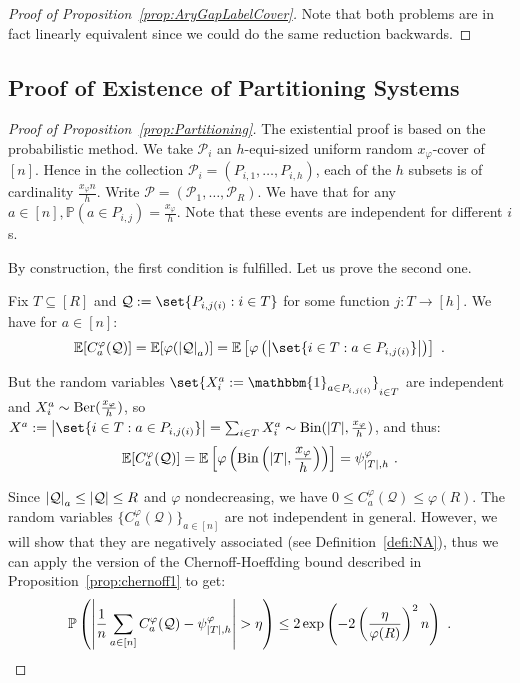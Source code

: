 \begin{proof}[Proof of Proposition~\ref{prop:AryGapLabelCover}]
 Note that both problems are in fact linearly equivalent since we could do the same reduction backwards.
 
\end{proof}

\subsection{Proof of Existence of Partitioning Systems}
\label{app:Partitioning}

\begin{proof}[Proof of Proposition~\ref{prop:Partitioning}]
    The existential proof is based on the probabilistic method. We take $\mathcal{P}_i$ an $h$-equi-sized uniform random $x_{\varphi}$-cover of $[n]$. Hence in the collection $\mathcal{P}_i=(P_{i,1},\ldots,P_{i,h})$, each of the $h$ subsets is of cardinality $\frac{x_{\varphi}n}{h}$. Write $\mathcal{P} = (\mathcal{P}_1,\ldots,\mathcal{P}_R)$. We have that for any $a \in [n], \mathbb{P}(a \in P_{i,j}) = \frac{x_{\varphi}}{h}$. Note that these events are independent for different $i$s.

    By construction, the first condition is fulfilled. Let us prove the second one.

    Fix $T \subseteq [R]$ and $\mathcal{Q} := \set{P_{i,j(i)} : i \in T}$ for some function $j : T \rightarrow [h]$. We have for $a \in [n]$:
    \[ \mathbb{E}[C_a^{\varphi}(\mathcal{Q})] =  \mathbb{E}[\varphi(\abs{\mathcal{Q}}_a)] = \mathbb{E}\left[\varphi\left(\abs{\set{i \in T: a \in P_{i,j(i)}}}\right)\right]\ .\]

    But the random variables $\set{X^a_i := \mathbbm{1}_{a \in P_{i,j(i)}}}_{i \in T}$ are independent and $X^a_i \sim \operatorname{\text{Ber}}(\frac{x_{\varphi}}{h})$, so $X^a :=\abs{\set{i \in T: a \in P_{i,j(i)}}} = \sum_{i \in T} X^a_i \sim \Bin(\abs{T},\frac{x_{\varphi}}{h})$, and thus:
    \[\mathbb{E}[C_a^{\varphi}(\mathcal{Q})] = \mathbb{E}\left[\varphi\left(\operatorname{\text{Bin}}\left(\abs{T},\frac{x_{\varphi}}{h}\right)\right)\right] =\psi^{\varphi}_{\abs{T},h}\ .\]

    Since $\abs{\mathcal{Q}}_a\leq \abs{\mathcal{Q}} \leq R$ and $\varphi$ nondecreasing, we have $0 \leq C_a^{\varphi}(\mathcal{Q}) \leq \varphi(R)$. The random variables $\{ C_a^{\varphi}(\mathcal{Q}) \}_{a \in [n]}$ are not independent in general. However, we will show that they are negatively associated (see Definition~\ref{defi:NA}), thus we can apply the version of the Chernoff-Hoeffding bound described in Proposition~\ref{prop:chernoff1} to get:
    \[ \mathbb{P}\left(\left|\frac{1}{n}\sum_{a \in [n]}C_a^{\varphi}(\mathcal{Q}) -\psi^{\varphi}_{\abs{T},h}\right| > \eta \right) \leq 2 \exp\left(-2\left(\frac{\eta}{\varphi(R)}\right)^2n\right)\ .\]


\end{proof}
